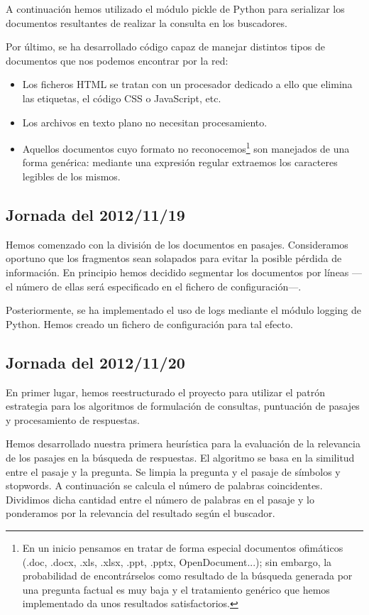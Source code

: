 \documentclass[12pt,a4paper,titlepage]{article}
\begin{document}
A continuación hemos utilizado el módulo pickle de Python para serializar los documentos resultantes de realizar la consulta en los buscadores.

Por último, se ha desarrollado código capaz de manejar distintos tipos de documentos que nos podemos encontrar por la red:
\begin{itemize}
\item Los ficheros HTML se tratan con un procesador dedicado a ello que elimina las etiquetas, el código CSS o JavaScript, etc.
\item Los archivos en texto plano no necesitan procesamiento.
\item Aquellos documentos cuyo formato no reconocemos\footnote{En un inicio pensamos en tratar de forma especial documentos ofimáticos (.doc, .docx, .xls, .xlsx, .ppt, .pptx, OpenDocument...); sin embargo, la probabilidad de encontrárselos como resultado de la búsqueda generada por una pregunta factual es muy baja y el tratamiento genérico que hemos implementado da unos resultados satisfactorios.} son manejados de una forma genérica: mediante una expresión regular extraemos los caracteres legibles de los mismos.
\end{itemize}

\subsection{Jornada del 2012/11/19}
Hemos comenzado con la división de los documentos en pasajes. Consideramos oportuno que los fragmentos sean solapados para evitar la posible pérdida de información. En principio hemos decidido segmentar los documentos por líneas ---el número de ellas será especificado en el fichero de configuración---.

Posteriormente, se ha implementado el uso de logs mediante el módulo logging de Python. Hemos creado un fichero de configuración para tal efecto.

\subsection{Jornada del 2012/11/20}
En primer lugar, hemos reestructurado el proyecto para utilizar el patrón estrategia para los algoritmos de formulación de consultas, puntuación de pasajes y procesamiento de respuestas.

Hemos desarrollado nuestra primera heurística para la evaluación de la relevancia de los pasajes en la búsqueda de respuestas. El algoritmo se basa en la similitud entre el pasaje y la pregunta. Se limpia la pregunta y el pasaje de símbolos y stopwords. A continuación se calcula el número de palabras coincidentes. Dividimos dicha cantidad entre el número de palabras en el pasaje y lo ponderamos por la relevancia del resultado según el buscador.
\end{document}
